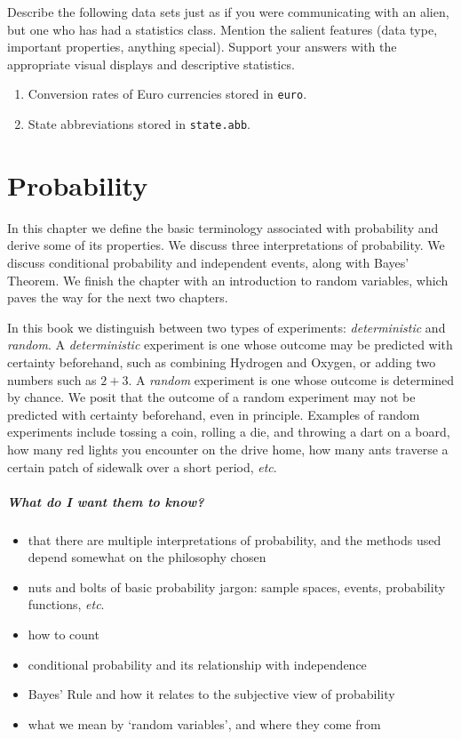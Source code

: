 \documentclass[captions=tableheading]{scrbook}
\begin{document}
\begin{xca}
Describe the following data sets just as if you were communicating with an alien, but one who has had a statistics class. Mention the salient features (data type, important properties, anything special). Support your answers with the appropriate visual displays and descriptive statistics.
\begin{enumerate}
\item Conversion rates of Euro currencies stored in \texttt{euro}.
\item State abbreviations stored in \texttt{state.abb}.
\end{enumerate}
\end{xca}
\chapter{Probability}
\label{sec-4}

\label{cha:Probability}


\noindent 
In this chapter we define the basic terminology associated with probability and derive some of its properties. We discuss three interpretations of probability. We discuss conditional probability and independent events, along with Bayes' Theorem. We finish the chapter with an introduction to random variables, which paves the way for the next two chapters.

In this book we distinguish between two types of experiments: \emph{deterministic} and \emph{random}. A \emph{deterministic} experiment is one whose outcome may be predicted with certainty beforehand, such as combining Hydrogen and Oxygen, or adding two numbers such as \(2+3\). A \emph{random} experiment is one whose outcome is determined by chance. We posit that the outcome of a random experiment may not be predicted with certainty beforehand, even in principle. Examples of random experiments include tossing a coin, rolling a die, and throwing a dart on a board, how many red lights you encounter on the drive home, how many ants traverse a certain patch of sidewalk over a short period, \emph{etc}.

\paragraph*{What do I want them to know?}

\begin{itemize}
\item that there are multiple interpretations of probability, and the methods used depend somewhat on the philosophy chosen
\item nuts and bolts of basic probability jargon: sample spaces, events, probability functions, \emph{etc}.
\item how to count
\item conditional probability and its relationship with independence
\item Bayes' Rule and how it relates to the subjective view of probability
\item what we mean by `random variables', and where they come from
\end{itemize}
\end{document}
